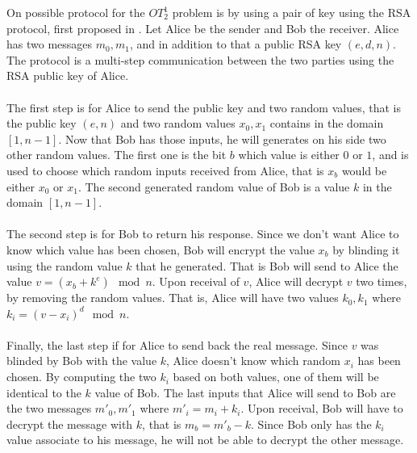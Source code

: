 \documentclass[11pt,a4paper]{article}
\begin{document}
\label{sec:ot}

On possible protocol for the $OT^1_2$ problem is by using a pair of
key using the RSA protocol, first proposed in \cite{even_randomized_1985}.
Let Alice be the sender and Bob the receiver.
Alice has two messages $m_0,m_1$, and in addition to that
a public RSA key $(e, d, n)$. The protocol is a multi-step
communication between the two parties using the RSA public key
of Alice.

\paragraph{}

The first step is for Alice
to send the public key and two random values, that is
the public key $(e, n)$ and two random values $x_0, x_1$
contains in the domain $[1, n-1]$. Now that Bob has those inputs,
he will generates on his side two other random values.
The first one is the bit $b$ which value is either $0$ or $1$,
and is used to choose which random inputs received from Alice,
that is $x_b$ would be either $x_0$ or $x_1$. The second
generated random value of Bob is a value $k$ in the domain
$[1, n-1]$.

\paragraph{}


The second step is for Bob to return his response. Since
we don't want Alice to know which value has been chosen, Bob
will encrypt the value $x_b$ by blinding it using the random value $k$
that he generated. That is Bob will send to Alice
the value $v = (x_b + k^e) \mod n$.
Upon receival of $v$, Alice will decrypt $v$ two times, by removing
the random values. That is, Alice will have two values $k_0, k_1$
where $k_i = (v - x_i)^d \mod n$.

\paragraph{}

Finally, the last step if for Alice to send back the real message.
Since $v$ was blinded by Bob
with the value $k$, Alice doesn't know which random $x_i$ has been chosen.
By computing the two $k_i$ based on both values, one of them
will be identical to the $k$ value of Bob. The last inputs that
Alice will send to Bob are the two messages $m'_0, m'_1$ where
$m'_i = m_i + k_i$. Upon receival, Bob will have to decrypt
the message with $k$, that is $m_b = m'_b - k$. Since Bob
only has the $k_i$ value associate to his message, he will not be
able to decrypt the other message.
\end{document}
